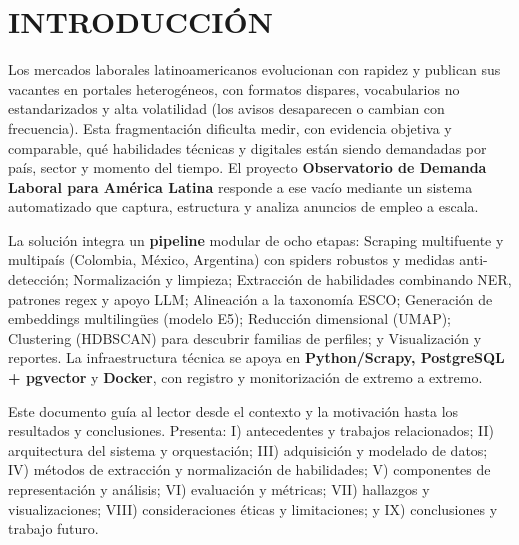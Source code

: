 \chapter{INTRODUCCIÓN}

Los mercados laborales latinoamericanos evolucionan con rapidez y publican sus vacantes en portales heterogéneos, con formatos dispares, vocabularios no estandarizados y alta volatilidad (los avisos desaparecen o cambian con frecuencia). Esta fragmentación dificulta medir, con evidencia objetiva y comparable, qué habilidades técnicas y digitales están siendo demandadas por país, sector y momento del tiempo. El proyecto \textbf{Observatorio de Demanda Laboral para América Latina} responde a ese vacío mediante un sistema automatizado que captura, estructura y analiza anuncios de empleo a escala.

La solución integra un \textbf{pipeline} modular de ocho etapas: Scraping multifuente y multipaís (Colombia, México, Argentina) con spiders robustos y medidas anti-detección; Normalización y limpieza; Extracción de habilidades combinando NER, patrones regex y apoyo LLM; Alineación a la taxonomía ESCO; Generación de embeddings multilingües (modelo E5); Reducción dimensional (UMAP); Clustering (HDBSCAN) para descubrir familias de perfiles; y Visualización y reportes. La infraestructura técnica se apoya en \textbf{Python/Scrapy, PostgreSQL + pgvector} y \textbf{Docker}, con registro y monitorización de extremo a extremo.

Este documento guía al lector desde el contexto y la motivación hasta los resultados y conclusiones. Presenta: I) antecedentes y trabajos relacionados; II) arquitectura del sistema y orquestación; III) adquisición y modelado de datos; IV) métodos de extracción y normalización de habilidades; V) componentes de representación y análisis; VI) evaluación y métricas; VII) hallazgos y visualizaciones; VIII) consideraciones éticas y limitaciones; y IX) conclusiones y trabajo futuro.
